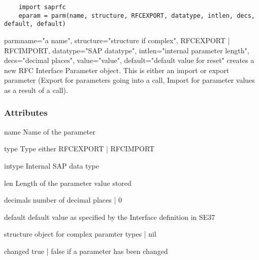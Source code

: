 \documentclass{howto}
\begin{document}
\begin{verbatim}
	import saprfc
	eparam = parm(name, structure, RFCEXPORT, datatype, intlen, decs, default, default)
\end{verbatim}


\begin{funcdesc}{parm}{name="a name", structure="structure if complex", RFCEXPORT | RFCIMPORT, datatype="SAP datatype", intlen="internal parameter length", decs="decimal places", value="value", default="default value for reset"}
creates a new RFC Interface Parameter object.  This is either an import or export parameter (Export for parameters going into a call, Import for parameter values as a result of a call).
\end{funcdesc}


\subsubsection{Attributes \label{parmattrs}}

\begin{memberdesc}[parm]{name}
    Name of the parameter
\end{memberdesc}

\begin{memberdesc}[parm]{type}
    Type either RFCEXPORT | RFCIMPORT
\end{memberdesc}

\begin{memberdesc}[parm]{intype}
    Internal SAP data type
\end{memberdesc}

\begin{memberdesc}[parm]{len}
     Length of the parameter value stored
\end{memberdesc}

\begin{memberdesc}[parm]{decimals}
     number of decimal places  | 0
\end{memberdesc}

\begin{memberdesc}[parm]{default}
     default value as specified by the Interface definition in SE37
\end{memberdesc}

\begin{memberdesc}[parm]{structure}
      object for complex paramter types | nil
\end{memberdesc}

\begin{memberdesc}[parm]{changed}
     true | false if a parameter has been changed
\end{memberdesc}
\end{document}
